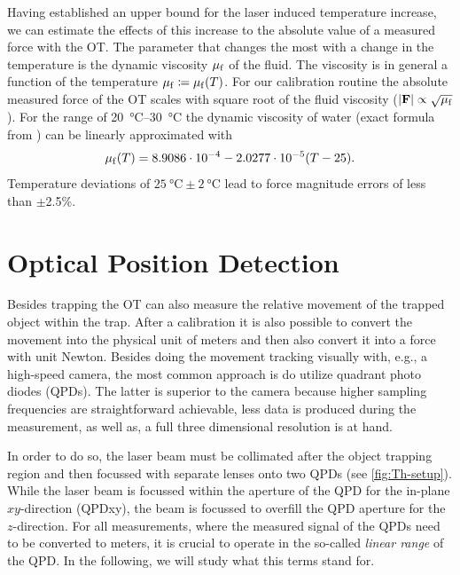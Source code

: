 Having established an upper bound for the laser induced temperature increase, 
we can estimate the effects of this increase to the absolute value of a 
measured force with the OT. The parameter that changes the most with a change 
in the temperature is the dynamic viscosity $\mu_{\mathrm{f}}$ of the fluid. The viscosity 
is in general a function of the temperature $\mu_{\mathrm{f}}\coloneqq\mu_{\mathrm{f}}(T)$. For our 
calibration routine the absolute measured force of the OT scales with square 
root of the fluid viscosity ($\abs{\vb{F}}\propto\sqrt{\mu_{\mathrm{f}}}$). For the 
range of \SIrange{20}{30}{\degreeCelsius} the dynamic viscosity of water (exact 
formula from \cite{Peterman2003}) can be linearly approximated with
\begin{equation}
  \mu_{\mathrm{f}}(T) = 8.9086\cdot 10^{-4} -2.0277\cdot10^{-5} (T-25).
  \label{eq:Th-viscosity}
\end{equation}
Temperature deviations of $\SI{25}{\degreeCelsius}\pm\SI{2}{\degreeCelsius}$ 
lead to force magnitude errors of less than $\pm$2.5\%.

\section{Optical Position Detection\label{sec:Th-QPD}}

Besides trapping the OT can also measure the relative movement of the trapped 
object within the trap. After a calibration it is also possible to convert the 
movement into the physical unit of meters and then also convert it into a force 
with unit Newton. Besides doing the movement tracking visually with, e.g., a 
high-speed camera, the most common approach is do utilize quadrant photo diodes 
(QPDs). The latter is superior to the camera because higher sampling 
frequencies are straightforward achievable, less data is produced during the 
measurement, as well as, a full three dimensional resolution is at hand.

In order to do so, the laser beam must be collimated after the object trapping 
region and then focussed with separate lenses onto two QPDs (see 
\cref{fig:Th-setup}). While the laser beam is focussed within the aperture of 
the QPD for the in-plane $xy$-direction (QPDxy), the beam is focussed to 
overfill the QPD aperture for the $z$-direction. For all measurements, where 
the measured signal of the QPDs need to be converted to meters, it is crucial 
to operate in the so-called \emph{linear range} of the QPD. In the following, 
we will study what this terms stand for.

